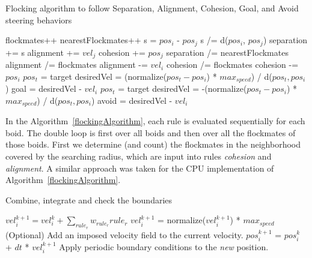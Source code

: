 \begin{algorithm}
\caption{Flocking algorithm to follow Separation, Alignment, Cohesion, Goal, and Avoid steering behaviors}
\label{flockingAlgorithm}
\begin{algorithmic}
	\STATE flockmates++
				\STATE nearestFlockmates++
				\STATE s = $pos_i$ - $pos_j$ 
				\STATE s /= d($pos_i$, $pos_j$) 
				\STATE separation += s
			\ENDIF
		\ENDIF
			\STATE alignment += $vel_j$
		\ENDIF
			\STATE cohesion += $pos_j$
		\ENDIF
	\ENDIF
\ENDFOR
{}
	\STATE separation /= nearestFlockmates
\ENDIF
{}
	\STATE alignment /=  flockmates
	\STATE alignment -= $vel_i$
\ENDIF
{}
	\STATE cohesion /=  flockmates
	\STATE cohesion -= $pos_i$
\ENDIF
{}
	\STATE $pos_t$ = target
	\STATE desiredVel = (normalize($pos_t - pos_i$) * $max_{speed}$) / d($pos_t, pos_i$) 
	\STATE goal = desiredVel - $vel_i$
\ENDIF
{}
	\STATE $pos_t$ = target
	\STATE desiredVel = -(normalize($pos_t - pos_i$) * $max_{speed}$) / d($pos_t, pos_i$) 
	\STATE avoid = desiredVel - $vel_i$
\ENDIF

\end{algorithmic}
\end{algorithm}

In the Algorithm~\ref{flockingAlgorithm}, each rule is evaluated sequentially for each boid. The double loop is first over all boids and then over all the flockmates of those boids. First we determine (and count) the flockmates in the neighborhood covered by the searching radius, which are input into rules \textit{cohesion} and \textit{alignment}. A similar approach was taken for the CPU implementation of Algorithm~\ref{flockingAlgorithm}.

\begin{algorithm}
\caption{Combine, integrate and check the boundaries}
\label{combineAlgorithm}
\begin{algorithmic}
\STATE $vel_i^{k+1} = vel_i^{k} + \sum_{rule_r} w_{rule_r} {rule_r} $
	\STATE $vel_i^{k+1}$ = normalize($vel_i^{k+1}$) * $max_{speed}$
\ENDIF  
\STATE (Optional) Add an imposed velocity field to the current velocity.
\STATE $pos_i^{k+1}$ = $pos_i^{k}$ + $dt$ * $vel_i^{k+1}$
\STATE Apply periodic boundary conditions to the \textit{new} position.
\end{algorithmic}
\end{algorithm}

